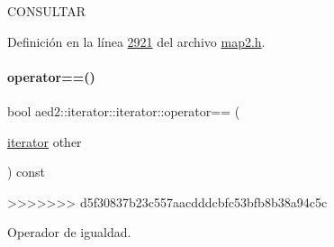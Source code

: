 C\+O\+N\+S\+U\+L\+T\+AR 

Definición en la línea \hyperlink{map2_8h_source_l02921}{2921} del archivo \hyperlink{map2_8h_source}{map2.\+h}.

\mbox{\label{classaed2_1_1iterator_1_1iterator_a565d56436e9490edab1ea31803af34ae_a565d56436e9490edab1ea31803af34ae}} 
\paragraph{\texorpdfstring{operator==()}{operator==()}}
{\footnotesize\ttfamily bool aed2\+::iterator\+::iterator\+::operator== (\begin{DoxyParamCaption}\item[{\hyperlink{classaed2_1_1iterator_1_1iterator}{iterator}}]{other }\end{DoxyParamCaption}) const\hspace{0.3cm}{\ttfamily [inline]}}

>>>>>>> d5f30837b23c557aacdddcbfc53bfb8b38a94c5c


Operador de igualdad. 


